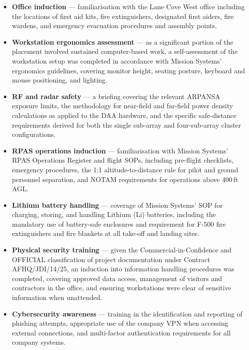 \begin{itemize}
    \item \textbf{Office induction} --- familiarisation with the Lane Cove West office
    including the locations of first aid kits, fire extinguishers, designated first aiders,
    fire wardens, and emergency evacuation procedures and assembly points.
 
    \item \textbf{Workstation ergonomics assessment} --- as a significant portion of the
    placement involved sustained computer-based work, a self-assessment of the workstation
    setup was completed in accordance with Mission Systems' ergonomics guidelines, covering
    monitor height, seating posture, keyboard and mouse positioning, and lighting.
 
    \item \textbf{RF and radar safety} --- a briefing covering the relevant ARPANSA exposure
    limits, the methodology for near-field and far-field power density calculations as applied
    to the DAA hardware, and the specific safe-distance requirements derived for both
    the single sub-array and four-sub-array cluster configurations.
 
    \item \textbf{RPAS operations induction} --- familiarisation with Mission Systems' RPAS
    Operations Register and flight SOPs, including pre-flight checklists, emergency procedures,
    the 1:1 altitude-to-distance rule for pilot and ground personnel separation, and NOTAM
    requirements for operations above 400\,ft AGL.
 
    \item \textbf{Lithium battery handling} --- coverage of Mission Systems' SOP for charging,
    storing, and handling Lithium (Li) batteries, including the mandatory use of battery-safe
    enclosures and requirement for F-500 fire extinguishers and fire blankets at all take-off
    and landing sites.
 
    \item \textbf{Physical security training} --- given the Commercial-in-Confidence and
    OFFICIAL classification of project documentation under Contract AFHQ/JDI/14/25, an
    induction into information handling procedures was completed, covering approved data access,
    management of visitors and contractors in the office, and ensuring workstations were clear
    of sensitive information when unattended.
 
    \item \textbf{Cybersecurity awareness} --- training in the identification and reporting of
    phishing attempts, appropriate use of the company VPN when accessing external connections,
    and multi-factor authentication requirements for all company systems.
\end{itemize}
 
